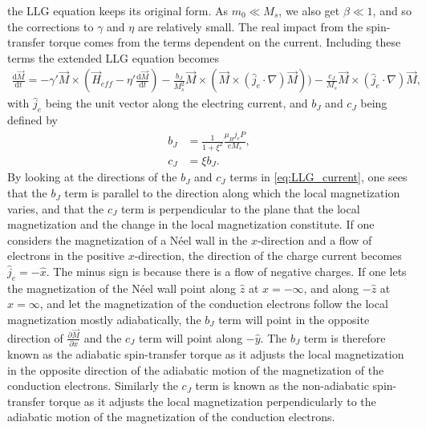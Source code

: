 \documentclass[12pt, a4paper, twoside, openright]{article}		%
\numberwithin{equation}{section}
\begin{document}
the LLG equation keeps its original form. As $m_0\ll M_s$, we also get $\beta \ll 1$, and so the corrections to $\gamma$ and $\eta$ are relatively small. The real impact from the spin-transfer torque comes from the terms dependent on the current. Including these terms the extended LLG equation becomes
\begin{align}
\label{eq:LLG_current}
\frac{\textrm{d} \vec{M}}{\textrm{d} t} = -\gamma ' \vec{M} \times (\vec{H}_{eff} - \eta '\frac{\textrm{d} \vec{M}}{\textrm{d} t}) - \frac{b_J}{M_s^2} \vec{M}\times (\vec{M}\times(\hat{j}_e\cdot\nabla)\vec{M})) - \frac{c_J}{ M_s}\vec{M}\times(\hat{j}_e\cdot\nabla)\vec{M},
\end{align}
with $\hat{j}_e$ being the unit vector along the electring current, and $b_J$ and $c_J$ being defined by
\begin{align}
\label{eq:bJ} b_J &= \frac{1}{1+\xi^2} \frac{\mu_B j_e P}{e M_s}, \\
c_J &= \xi b_J.
\end{align}
By looking at the directions of the $b_J$ and $c_J$ terms in \eqref{eq:LLG_current}, one sees that the $b_J$ term is parallel to the direction along which the local magnetization varies, and that the $c_J$ term is perpendicular to the plane that the local magnetization and the change in the local magnetization constitute. If one considers the magnetization of a N\'{e}el wall in the $x$-direction and a flow of electrons in the positive $x$-direction, the direction of the charge current becomes $\hat{j}_e = -\hat{x}$. The minus sign is because there is a flow of negative charges. If one lets the magnetization of the N\'{e}el wall point along $\hat{z}$ at $x = -\infty$, and along $-\hat{z}$ at $x = \infty$, and let the magnetization of the conduction electrons follow the local magnetization mostly adiabatically, the $b_J$ term will point in the opposite direction of $\frac{\partial \vec{M}}{\partial x}$ and the $c_J$ term will point along $-\hat{y}$. The $b_J$ term is therefore known as the adiabatic spin-transfer torque as it adjusts the local magnetization in the opposite direction of the adiabatic motion of the magnetization of the conduction electrons. Similarly the $c_J$ term is known as the non-adiabatic spin-transfer torque as it adjusts the local magnetization perpendicularly to the adiabatic motion of the magnetization of the conduction electrons. 
\end{document}
